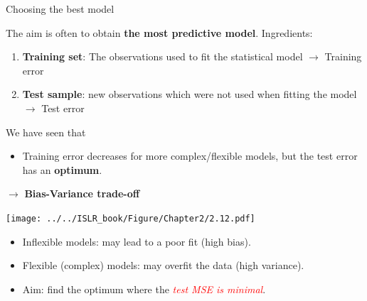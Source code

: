 \documentclass[
  ignorenonframetext,
]{beamer}
\providecommand{\tightlist}{%
  \setlength{\itemsep}{0pt}\setlength{\parskip}{0pt}}
\begin{document}
\begin{frame}
\begin{block}{Choosing the best model}
\protect\hypertarget{choosing-the-best-model}{}
\(~\)

The aim is often to obtain \textbf{the most predictive model}.
Ingredients:

\vspace{2mm}

\begin{enumerate}
\tightlist
\item
  \textbf{Training set}: The observations used to fit the statistical
  model \(\rightarrow\) Training error
\end{enumerate}

\vspace{2mm}

\begin{enumerate}
\setcounter{enumi}{1}
\tightlist
\item
  \textbf{Test sample}: new observations which were not used when
  fitting the model \(\rightarrow\) Test error
\end{enumerate}

\vspace{4mm}

We have seen that

\vspace{4mm}

\begin{itemize}
\tightlist
\item
  Training error decreases for more complex/flexible models, but the
  test error has an \textbf{optimum}.
\end{itemize}

\centering

\(\rightarrow\) \textbf{Bias-Variance trade-off}
\end{block}
\end{frame}

\begin{frame}
\texttt{[image: ../../ISLR\_book/Figure/Chapter2/2.12.pdf]}

\begin{itemize}
\tightlist
\item
  Inflexible models: may lead to a poor fit (high bias).
\item
  Flexible (complex) models: may overfit the data (high variance).
\item
  Aim: find the optimum where the
  \emph{\textcolor{red}{test MSE is minimal}}.
\end{itemize}
\end{frame}
\end{document}
